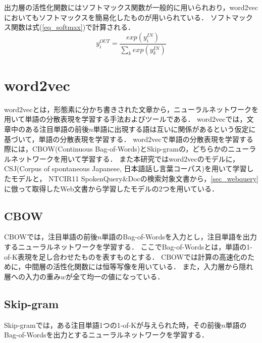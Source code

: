出力層の活性化関数にはソフトマックス関数が一般的に用いられおり，word2vecにおいてもソフトマックスを簡易化したものが用いられている．
ソフトマックス関数は式(\ref{eq_softmax})で計算される．
\begin{equation}
    y_i^{OUT} = \frac{exp(y_i^{IN})}{\sum_k exp(y_k^{IN})}  \label{eq_softmax}
\end{equation}

\section{word2vec}
word2vec\cite{word2vec}とは，形態素に分かち書きされた文章から，ニューラルネットワークを用いて単語の分散表現を学習する手法およびツールである．
word2vecでは，文章中のある注目単語の前後$n$単語に出現する語は互いに関係があるという仮定に基づいて，単語の分散表現を学習する．
word2vecで単語の分散表現を学習する際には，CBOW(Continuous Bag-of-Words)とSkip-gramの，どちらかのニューラルネットワークを用いて学習する．
また本研究ではword2vecのモデルに，CSJ(Corpus of spontaneous Japanese, 日本語話し言葉コーパス)を用いて学習したモデルと，
NTCIR11 SpokenQuery\&Docの検索対象文書から，\ref{sec_webquery}に倣って取得したWeb文書から学習したモデルの2つを用いている．
\subsection{CBOW}
CBOWでは，注目単語の前後$n$単語のBag-of-Wordsを入力とし，注目単語を出力するニューラルネットワークを学習する．
ここでBag-of-Wordsとは，単語の1-of-K表現を足し合わせたものを表すものとする．
CBOWでは計算の高速化のために，中間層の活性化関数には恒等写像を用いている．
また，入力層から隠れ層への入力の重み$w$が全て均一の値になっている．
\subsection{Skip-gram}
Skip-gramでは，ある注目単語1つの1-of-Kが与えられた時，その前後$n$単語のBag-of-Wordsを出力とするニューラルネットワークを学習する．
